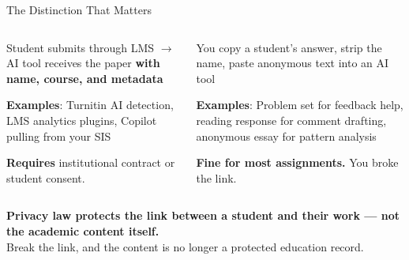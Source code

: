 \documentclass[aspectratio=169, 10pt]{beamer}
\begin{document}
\begin{frame}{The Distinction That Matters}

\begin{columns}[T]
\begin{column}{0.48\textwidth}
\begin{tcolorbox}[colback=SoftCoral!10, colframe=SoftCoral, boxrule=0.8pt, arc=3pt, left=6pt, right=6pt, top=4pt, bottom=4pt, title={\footnotesize\bfseries\color{white} System-to-System (identity attached)}, colbacktitle=SoftCoral]
\footnotesize
Student submits through LMS $\to$ AI tool receives the paper \textbf{with name, course, and metadata}

\vspace{0.15cm}

\textbf{Examples}:\; Turnitin AI detection, LMS analytics plugins, Copilot pulling from your SIS

\vspace{0.15cm}

\faTimesCircle\; \textbf{Requires} institutional contract or student consent.
\end{tcolorbox}
\end{column}

\begin{column}{0.48\textwidth}
\begin{tcolorbox}[colback=UVMGreen!8, colframe=UVMGreen, boxrule=0.8pt, arc=3pt, left=6pt, right=6pt, top=4pt, bottom=4pt, title={\footnotesize\bfseries\color{white} Manual De-Identification (link broken)}, colbacktitle=UVMGreen]
\footnotesize
You copy a student's answer, strip the name, paste anonymous text into an AI tool

\vspace{0.15cm}

\textbf{Examples}:\; Problem set for feedback help, reading response for comment drafting, anonymous essay for pattern analysis

\vspace{0.15cm}

\faCheckCircle\; \textbf{Fine for most assignments.} You broke the link.
\end{tcolorbox}
\end{column}
\end{columns}

\vspace{0.2cm}

\begin{tcolorbox}[accentbox]
\centering
\footnotesize\textbf{Privacy law protects the link between a student and their work --- not the academic content itself.}\\[2pt]
\scriptsize Break the link, and the content is no longer a protected education record.
\end{tcolorbox}

\end{frame}
\end{document}

